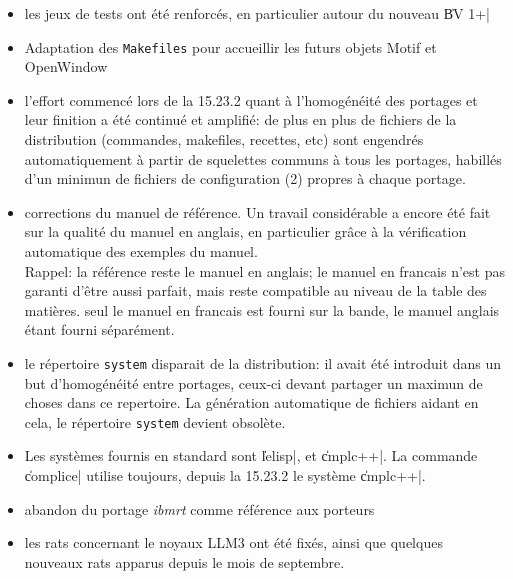 \begin {itemize}

\item les jeux de tests ont \'{e}t\'{e} renforc\'{e}s, en
particulier autour du nouveau \|BV 1+|

\item Adaptation des {\tt Makefiles} pour accueillir les futurs objets
Motif et OpenWindow

\item l'effort commenc\'{e} lors de la
15.23.2 quant \`{a} l'homog\'{e}n\'{e}it\'{e} des portages et leur finition a
\'{e}t\'{e} continu\'{e} et amplifi\'{e}: de plus en plus de fichiers de la
distribution (commandes, makefiles, recettes, etc) sont engendr\'{e}s
automatiquement \`{a} partir de squelettes communs \`{a} tous les portages,
habill\'{e}s d'un minimun de fichiers de configuration (2) propres \`{a} chaque
portage. 

\item corrections du manuel de r\'{e}f\'{e}rence. Un travail consid\'{e}rable a
encore \'{e}t\'{e} fait sur la qualit\'{e} du manuel en anglais, en particulier
gr\^{a}ce \`{a} la v\'{e}rification automatique des exemples du manuel.\\
Rappel: la r\'{e}f\'{e}rence reste le manuel en anglais; le manuel en
francais n'est pas garanti d'\^{e}tre aussi parfait, mais reste
compatible au niveau de la table des mati\`{e}res. seul le manuel en
francais est fourni sur la bande, le manuel anglais \'{e}tant fourni
s\'{e}par\'{e}ment. 

\item le r\'{e}pertoire {\tt system} disparait de la distribution: il avait
\'{e}t\'{e} introduit dans un but d'homog\'{e}n\'{e}it\'{e} entre portages, ceux-ci
devant partager un maximun de choses dans ce repertoire. La
g\'{e}n\'{e}ration automatique de fichiers aidant en cela, le r\'{e}pertoire
{\tt system} devient obsol\`{e}te.

\item Les syst\`{e}mes fournis en standard sont \|lelisp|, et \|cmplc++|.
La commande \|complice| utilise toujours, depuis la 15.23.2 le
syst\`{e}me \|cmplc++|.

\item abandon du portage {\it ibmrt} comme r\'{e}f\'{e}rence aux porteurs

\item les rats concernant le noyaux LLM3 ont \'{e}t\'{e} fix\'{e}s, ainsi que
quelques nouveaux rats apparus depuis le mois de septembre.


\end{itemize}
